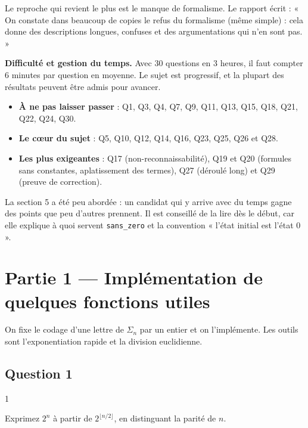 \documentclass[11pt,a4paper]{article}
\providecommand{\tightlist}{\setlength{\itemsep}{0pt}\setlength{\parskip}{0pt}}
\begin{document}
Le reproche qui revient le plus est le manque de formalisme. Le rapport écrit : « On constate dans beaucoup de copies le refus du formalisme (même simple) : cela donne des descriptions longues, confuses et des argumentations qui n'en sont pas. »

\textbf{Difficulté et gestion du temps.} Avec 30 questions en 3 heures, il faut compter 6 minutes par question en moyenne. Le sujet est progressif, et la plupart des résultats peuvent être admis pour avancer.

\begin{itemize}
\tightlist
\item
  \textbf{À ne pas laisser passer} : Q1, Q3, Q4, Q7, Q9, Q11, Q13, Q15, Q18, Q21, Q22, Q24, Q30.
\item
  \textbf{Le cœur du sujet} : Q5, Q10, Q12, Q14, Q16, Q23, Q25, Q26 et Q28.
\item
  \textbf{Les plus exigeantes} : Q17 (non-\allowbreak{}reconnaissabilité), Q19 et Q20 (formules sans constantes, aplatissement des termes), Q27 (déroulé long) et Q29 (preuve de correction).
\end{itemize}

La section 5 a été peu abordée : un candidat qui y arrive avec du temps gagne des points que peu d'autres prennent. Il est conseillé de la lire dès le début, car elle explique à quoi servent \texttt{sans\_zero} et la convention « l'état initial est l'état 0 ».

\hypertarget{partie-1-impluxe9mentation-de-quelques-fonctions-utiles}{%
\section{Partie 1 --- Implémentation de quelques fonctions utiles}\label{partie-1-impluxe9mentation-de-quelques-fonctions-utiles}}

On fixe le codage d'une lettre de \(\Sigma_n\) par un entier et on l'implémente. Les outils sont l'exponentiation rapide et la division euclidienne.

\hypertarget{question-1}{%
\subsection{Question 1}\label{question-1}}

\begin{indication}{1}

Exprimez \(2^n\) à partir de \(2^{\lfloor n/2\rfloor}\), en distinguant la parité de \(n\).

\end{indication}
\end{document}
